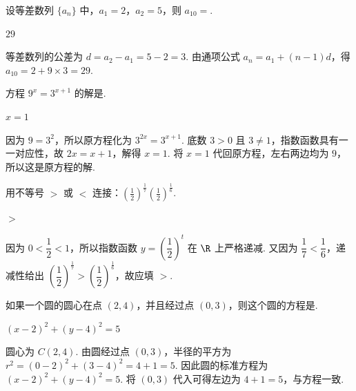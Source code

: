 \documentclass[UTF8,a4paper,oneside,11pt]{ctexbook}
\begin{document}
\begin{problem}

设等差数列 \(\{a_n\}\) 中，\(a_1=2\)，\(a_2=5\)，则 \(a_{10}=\)\fillinblank{}.

\begin{answer}
\(29\)
\end{answer}

\begin{solution}
等差数列的公差为 \(d=a_2-a_1=5-2=3\). 由通项公式 \(a_n=a_1+(n-1)d\)，得 \(a_{10}=2+9\times3=29\).
\end{solution}
\end{problem}

\begin{problem}

方程 \(9^x=3^{x+1}\) 的解是\fillinblank{}.

\begin{answer}
\(x=1\)
\end{answer}

\begin{solution}
因为 \(9=3^2\)，所以原方程化为 \(3^{2x}=3^{x+1}\). 底数 \(3>0\) 且 \(3\neq1\)，指数函数具有一一对应性，故 \(2x=x+1\)，解得 \(x=1\). 将 \(x=1\) 代回原方程，左右两边均为 \(9\)，所以这是原方程的解.
\end{solution}
\end{problem}

\begin{problem}

用不等号 \(>\) 或 \(<\) 连接：\(\left(\frac{1}{2}\right)^{\frac{1}{7}}\)\fillinblank{}\(\left(\frac{1}{2}\right)^{\frac{1}{6}}\).

\begin{answer}
\(>\)
\end{answer}

\begin{solution}
因为 \(0<\dfrac{1}{2}<1\)，所以指数函数 \(y=\left(\dfrac{1}{2}\right)^t\) 在 \(\R\) 上严格递减. 又因为 \(\dfrac{1}{7}<\dfrac{1}{6}\)，递减性给出 \(\left(\dfrac{1}{2}\right)^{\frac{1}{7}}>\left(\dfrac{1}{2}\right)^{\frac{1}{6}}\)，故应填 \(>\).
\end{solution}
\end{problem}

\begin{problem}

如果一个圆的圆心在点 \((2,4)\)，并且经过点 \((0,3)\)，则这个圆的方程是\fillinblank{}.

\begin{answer}
\(\left(x-2\right)^2+\left(y-4\right)^2=5\)
\end{answer}

\begin{solution}
圆心为 \(C(2,4)\). 由圆经过点 \((0,3)\)，半径的平方为 \(r^2=(0-2)^2+(3-4)^2=4+1=5\). 因此圆的标准方程为 \(\left(x-2\right)^2+\left(y-4\right)^2=5\). 将 \((0,3)\) 代入可得左边为 \(4+1=5\)，与方程一致.
\end{solution}
\end{problem}
\end{document}
